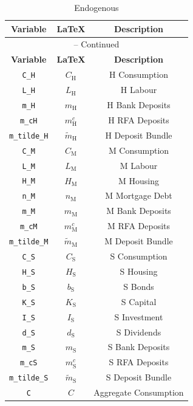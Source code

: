 \begin{center}
\begin{longtable}{ccc}
\caption{Endogenous}\\%
\hline%
\multicolumn{1}{c}{\textbf{Variable}} &
\multicolumn{1}{c}{\textbf{\LaTeX}} &
\multicolumn{1}{c}{\textbf{Description}}\\%
\hline\hline%
\endfirsthead
\multicolumn{3}{c}{{\tablename} \thetable{} -- Continued}\\%
\hline%
\multicolumn{1}{c}{\textbf{Variable}} &
\multicolumn{1}{c}{\textbf{\LaTeX}} &
\multicolumn{1}{c}{\textbf{Description}}\\%
\hline\hline%
\endhead
\texttt{C\_H} & $C_\mathrm{H}$ & H Consumption\\
\texttt{L\_H} & $L_\mathrm{H}$ & H Labour\\
\texttt{m\_H} & $m_\mathrm{H}$ & H Bank Deposits\\
\texttt{m\_cH} & $m^c_\mathrm{H}$ & H RFA Deposits\\
\texttt{m\_tilde\_H} & $\widetilde{m}_\mathrm{H}$ & H Deposit Bundle\\
\texttt{C\_M} & $C_\mathrm{M}$ & M Consumption\\
\texttt{L\_M} & $L_\mathrm{M}$ & M Labour\\
\texttt{H\_M} & $H_\mathrm{M}$ & M Housing\\
\texttt{n\_M} & $n_\mathrm{M}$ & M Mortgage Debt\\
\texttt{m\_M} & $m_\mathrm{M}$ & M Bank Deposits\\
\texttt{m\_cM} & $m^c_\mathrm{M}$ & M RFA Deposits\\
\texttt{m\_tilde\_M} & $\widetilde{m}_\mathrm{M}$ & M Deposit Bundle\\
\texttt{C\_S} & $C_\mathrm{S}$ & S Consumption\\
\texttt{H\_S} & $H_\mathrm{S}$ & S Housing\\
\texttt{b\_S} & $b_\mathrm{S}$ & S Bonds\\
\texttt{K\_S} & $K_\mathrm{S}$ & S Capital\\
\texttt{I\_S} & $I_\mathrm{S}$ & S Investment\\
\texttt{d\_S} & $d_\mathrm{S}$ & S Dividends\\
\texttt{m\_S} & $m_\mathrm{S}$ & S Bank Deposits\\
\texttt{m\_cS} & $m^c_\mathrm{S}$ & S RFA Deposits\\
\texttt{m\_tilde\_S} & $\widetilde{m}_\mathrm{S}$ & S Deposit Bundle\\
\texttt{C} & $C$ & Aggregate Consumption\\

\end{longtable}
\end{center}
